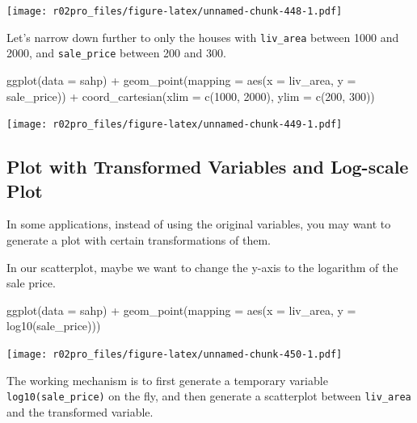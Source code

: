 \documentclass[
]{book}
\newenvironment{Shaded}{\begin{snugshade}}{\end{snugshade}}
\newcommand{\AttributeTok}[1]{\textcolor[rgb]{0.77,0.63,0.00}{#1}}
\newcommand{\DecValTok}[1]{\textcolor[rgb]{0.00,0.00,0.81}{#1}}
\newcommand{\FunctionTok}[1]{\textcolor[rgb]{0.00,0.00,0.00}{#1}}
\newcommand{\NormalTok}[1]{#1}
\newcommand{\SpecialCharTok}[1]{\textcolor[rgb]{0.00,0.00,0.00}{#1}}
\begin{document}
\texttt{[image: r02pro\_files/figure-latex/unnamed-chunk-448-1.pdf]}

Let's narrow down further to only the houses with \texttt{liv\_area} between 1000 and 2000, and \texttt{sale\_price} between 200 and 300.

\begin{Shaded}
\begin{Highlighting}[]
\FunctionTok{ggplot}\NormalTok{(}\AttributeTok{data =}\NormalTok{ sahp) }\SpecialCharTok{+} \FunctionTok{geom\_point}\NormalTok{(}\AttributeTok{mapping =} \FunctionTok{aes}\NormalTok{(}\AttributeTok{x =}\NormalTok{ liv\_area, }\AttributeTok{y =}\NormalTok{ sale\_price))  }\SpecialCharTok{+}
  \FunctionTok{coord\_cartesian}\NormalTok{(}\AttributeTok{xlim =} \FunctionTok{c}\NormalTok{(}\DecValTok{1000}\NormalTok{, }\DecValTok{2000}\NormalTok{), }\AttributeTok{ylim =} \FunctionTok{c}\NormalTok{(}\DecValTok{200}\NormalTok{, }\DecValTok{300}\NormalTok{))}
\end{Highlighting}
\end{Shaded}

\texttt{[image: r02pro\_files/figure-latex/unnamed-chunk-449-1.pdf]}

\hypertarget{plot-with-transformed-variables-and-log-scale-plot}{%
\subsection{Plot with Transformed Variables and Log-scale Plot}\label{plot-with-transformed-variables-and-log-scale-plot}}

In some applications, instead of using the original variables, you may want to generate a plot with certain transformations of them.

In our scatterplot, maybe we want to change the y-axis to the logarithm of the sale price.

\begin{Shaded}
\begin{Highlighting}[]
\FunctionTok{ggplot}\NormalTok{(}\AttributeTok{data =}\NormalTok{ sahp) }\SpecialCharTok{+} \FunctionTok{geom\_point}\NormalTok{(}\AttributeTok{mapping =} \FunctionTok{aes}\NormalTok{(}\AttributeTok{x =}\NormalTok{ liv\_area, }\AttributeTok{y =} \FunctionTok{log10}\NormalTok{(sale\_price)))}
\end{Highlighting}
\end{Shaded}

\texttt{[image: r02pro\_files/figure-latex/unnamed-chunk-450-1.pdf]}

The working mechanism is to first generate a temporary variable \texttt{log10(sale\_price)} on the fly, and then generate a scatterplot between \texttt{liv\_area} and the transformed variable.
\end{document}

